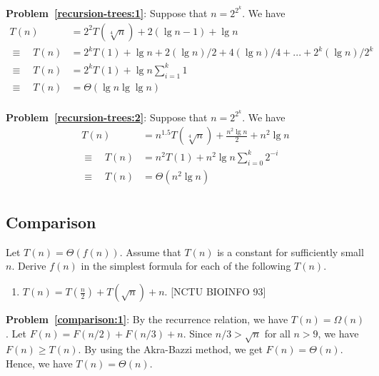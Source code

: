 \begin{refsection}
\begin{Answer}
{\bf Problem~\ref{recursion-trees:1}}: Suppose that $n = 2^{2^k}$. We have
\begin{align*}
T(n) &= 2^2T(\sqrt[4]{n}) + 2(\lg n - 1) + \lg n \\
\equiv \quad T(n) &= 2^k T(1) + \lg n + 2(\lg n)/2 + 4(\lg n)/4 + ... + 2^k(\lg n)/2^k \\
\equiv \quad T(n) &= 2^k T(1) + \lg n \sum_{i=1}^k 1 \\
\equiv \quad T(n) &= \Theta(\lg n \lg \lg n) \\
\end{align*}

{\bf Problem~\ref{recursion-trees:2}}: Suppose that $n = 2^{2^k}$. We have
\begin{align*}
T(n) &= n^{1.5}T(\sqrt[4]{n}) + \frac{n^2 \lg n}{2} + n^2 \lg n \\
\equiv \quad T(n) &= n^2 T(1) + n^2 \lg n \sum_{i=0}^k 2^{-i} \\
\equiv \quad T(n) &= \Theta(n^2 \lg n) \\
\end{align*}

\end{Answer}


\subsection{Comparison}
\begin{Exercise}
Let $T(n) = \Theta(f(n))$. Assume that $T(n)$ is a constant for sufficiently small $n$. Derive $f(n)$ in the simplest formula for each of the following $T(n)$.
\begin{enumerate}
\item $T(n) = T(\frac{n}{2}) + T(\sqrt{n}) + n$. \label{comparison:1} [NCTU BIOINFO 93]
\end{enumerate}
\end{Exercise}
\begin{Answer}

{\bf Problem~\ref{comparison:1}}: By the recurrence relation, we have $T(n) = \Omega(n)$. Let $F(n) = F(n/2) + F(n/3) + n$. Since $n/3 >  \sqrt{n}$ for all $n > 9$, we have $F(n) \geq T(n)$.
By using the Akra\--Bazzi method, we get $F(n) = \Theta(n)$.
Hence, we have $T(n) = \Theta(n)$.
\end{Answer}

\printbibliography[heading=subbibliography]
\end{refsection}
